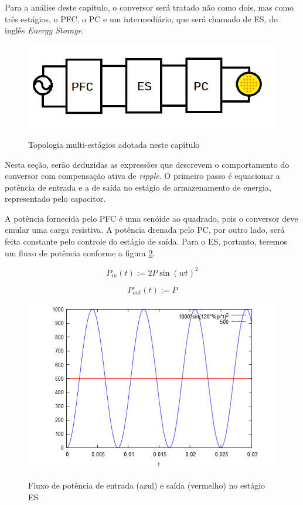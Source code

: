 \documentclass[
        12pt,
        openany, %
        oneside, %
        a4paper,			
        english,			
        brazil
        ]{abntbibufjf}
\begin{document}

Para a análise deste capítulo, o conversor será tratado não como dois, mas como três estágios, o PFC, o PC e um intermediário, que será chamado de ES, do inglês \textit{Energy Storage}.

\begin{figure}[!h]
	\centering
	\caption{Topologia multi-estágios adotada neste capítulo}
	\includegraphics[scale=.8]{../ESQUEMAS/treestage.png}\\
	\label{c}
\end{figure}

Nesta seção, serão deduzidas as expressões que descrevem o comportamento do conversor com compensação ativa de \textit{ripple}. O primeiro passo é equacionar a potência de entrada e a de saída no estágio de armazenamento de energia, representado pelo capacitor.

A potência fornecida pelo PFC é uma senóide ao quadrado, pois o conversor deve emular uma carga resistiva. A potência drenada pelo PC, por outro lado, será feita constante pelo controle do estágio de saída. Para o ES, portanto, teremos um fluxo de potência conforme a figura \ref{cs5_1}.

\begin{equation}
P_{in}(t):=2P\sin{(wt)}^2
\end{equation}

\begin{equation}
P_{out}(t):=P
\end{equation}

\begin{figure}[!h]
	\centering
	\caption{Fluxo de potência de entrada (azul) e saída (vermelho) no estágio ES}
	\includegraphics[width=.75\linewidth,height=.80\textheight,keepaspectratio]{../GRAFICOS/cs5_img/cs5_1}
	\label{cs5_1}
\end{figure}
\end{document}
